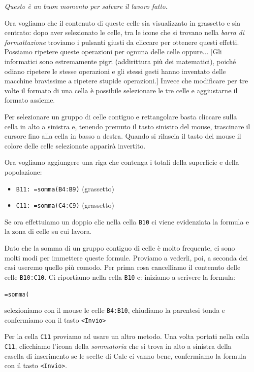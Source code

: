 \emph{Questo è un buon momento per salvare il lavoro fatto.}

Ora vogliamo che il contenuto di queste celle sia visualizzato in grassetto
e sia centrato: dopo aver selezionato le celle, tra le icone che si trovano
nella \emph{barra di formattazione} troviamo i pulsanti giusti da cliccare per
ottenere questi effetti.
Possiamo ripetere queste operazioni per ognuna delle celle oppure...
{[}Gli informatici sono estremamente pigri (addirittura più dei matematici),
poiché odiano ripetere le stesse operazioni e gli stessi gesti hanno
inventato delle macchine bravissime a ripetere stupide operazioni.{]}
Invece che modificare per tre volte il formato di una cella è possibile
selezionare le tre celle e aggiustarne il formato assieme.

Per selezionare un gruppo di celle contiguo e rettangolare basta cliccare
sulla cella in alto a sinistra e, tenendo premuto il tasto sinistro del
mouse, trascinare il cursore fino alla cella in basso a destra.
Quando si rilascia il tasto del mouse il colore delle celle selezionate
apparirà invertito.

Ora vogliamo aggiungere una riga che contenga i totali della superficie e
della popolazione:

\begin{itemize}
\item {}
\texttt{B11: =somma(B4:B9)}
(grassetto)

\item {}\texttt{C11: =somma(C4:C9)}
(grassetto)

\end{itemize}

Se ora effettuiamo un doppio clic nella cella \texttt{B10} ci viene evidenziata la
formula e la zona di celle su cui lavora.

Dato che la somma di un gruppo contiguo di celle è molto frequente, ci sono
molti modi per immettere queste formule. Proviamo a vederli, poi, a seconda
dei casi useremo quello più comodo. 
Per prima cosa cancelliamo il contenuto delle celle \texttt{B10:C10}.
Ci riportiamo nella cella \texttt{B10} e: iniziamo a scrivere la formula:

\texttt{=somma(}

selezioniamo con il mouse le celle \texttt{B4:B10},
chiudiamo la parentesi tonda e confermiamo con il tasto 
\texttt{\textless{}Invio\textgreater{}}

Per la cella \texttt{C11} proviamo ad usare un altro metodo.
Una volta portati nella cella \texttt{C11}, clicchiamo l'icona della \emph{sommatoria}
che si trova in alto a sinistra della casella di inserimento se le scelte
di Calc ci vanno bene, confermiamo la formula con il tasto 
\texttt{\textless{}Invio\textgreater{}}.

